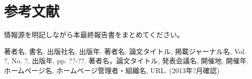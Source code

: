 \section{参考文献}

情報源を明記しながら本最終報告書をまとめてください。

\begin{thebibliography}{99}
   著者名, 書名, 出版社名, 出版年.
   著者名, 論文タイトル, 掲載ジャーナル名, Vol. ?, No. ?, 出版年, pp. ??-??.
   著者名，論文タイトル, 発表会議名, 開催地, 開催年.
   ホームページ名, ホームページ管理者・組織名, URL. (2013年?月確認)
\end{thebibliography}
